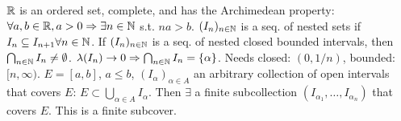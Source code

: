 $\mathbb{R}$ is an ordered set, complete, and has the Archimedean property:
$\forall a, b \in \mathbb{R}, a > 0 \Rightarrow \exists n \in \mathbb{N}$ s.t. $na > b$.
 $(I_n)_{n \in \mathbb{N}}$ is a seq. of nested sets if $I_n \subseteq I_{n+1} \forall n \in \mathbb{N}$.
If $(I_n)_{n \in \mathbb{N}}$ is a seq. of nested closed bounded intervals, then $\bigcap_{n \in \mathbb{N}} I_n \neq \emptyset$.
$\lambda(I_n) \to 0 \Rightarrow \bigcap_{n \in \mathbb{N}} I_n = \{\alpha\}$.
Needs closed: $(0, 1/n)$, bounded: $[n, \infty)$.
 $E = [a, b]$, $a \le b$, $(I_\alpha)_{\alpha \in A}$ an arbitrary collection
of open intervals that covers $E$: $E \subset \bigcup_{\alpha \in A} I_\alpha$.
Then $\exists$ a finite subcollection $(I_{\alpha_1}, \dots, I_{\alpha_n})$
that covers $E$. This is a finite subcover.
